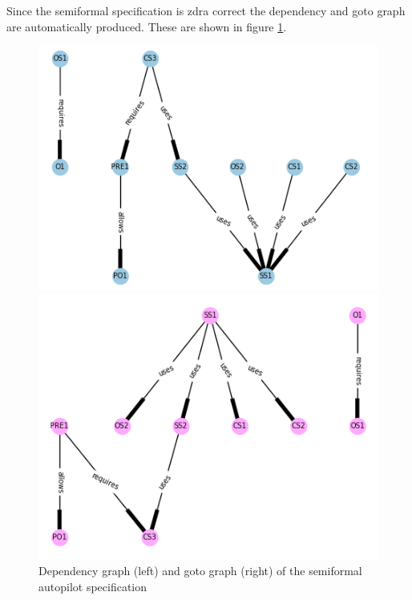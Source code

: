 Since the semiformal specification is \gls{zdra} correct the dependency and goto
graph are automatically produced. These are shown in figure \ref{fig:sfdepgoto}.

\begin{figure}[H]
\centering
\begin{minipage}{0.45\textwidth}
\centering
\includegraphics[scale=0.5]{Figures/fullexample/sfdp.png}
\end{minipage}\hfill
\begin{minipage}{0.45\textwidth}
\centering
\includegraphics[scale=0.5]{Figures/fullexample/sfgoto.png}
\end{minipage}
\caption{Dependency graph (left) and goto graph (right) of the semiformal autopilot specification\label{fig:sfdepgoto}}
\end{figure}

